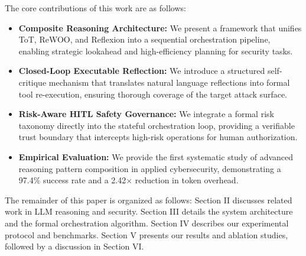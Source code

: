 The core contributions of this work are as follows:
\begin{itemize}
    \item \textbf{Composite Reasoning Architecture:} We present a framework that unifies ToT, ReWOO, and Reflexion into a sequential orchestration pipeline, enabling strategic lookahead and high-efficiency planning for security tasks.
    \item \textbf{Closed-Loop Executable Reflection:} We introduce a structured self-critique mechanism that translates natural language reflections into formal tool re-execution, ensuring thorough coverage of the target attack surface.
    \item \textbf{Risk-Aware HITL Safety Governance:} We integrate a formal risk taxonomy directly into the stateful orchestration loop, providing a verifiable trust boundary that intercepts high-risk operations for human authorization.
    \item \textbf{Empirical Evaluation:} We provide the first systematic study of advanced reasoning pattern composition in applied cybersecurity, demonstrating a 97.4\% success rate and a 2.42$\times$ reduction in token overhead.
\end{itemize}

The remainder of this paper is organized as follows: Section II discusses related work in LLM reasoning and security. Section III details the system architecture and the formal orchestration algorithm. Section IV describes our experimental protocol and benchmarks. Section V presents our results and ablation studies, followed by a discussion in Section VI.
